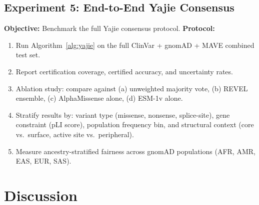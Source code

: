\documentclass[11pt,a4paper]{article}
\theoremstyle{definition}
\begin{document}
\subsection{Experiment 5: End-to-End Yajie Consensus}
\textbf{Objective:} Benchmark the full Yajie consensus protocol.
\textbf{Protocol:}
\begin{enumerate}[leftmargin=*]
    \item Run Algorithm~\ref{alg:yajie} on the full ClinVar + gnomAD + MAVE combined test set.
    \item Report certification coverage, certified accuracy, and uncertainty rates.
    \item Ablation study: compare against (a) unweighted majority vote, (b) REVEL ensemble, (c) AlphaMissense alone, (d) ESM-1v alone.
    \item Stratify results by: variant type (missense, nonsense, splice-site), gene constraint (pLI score), population frequency bin, and structural context (core vs.\ surface, active site vs.\ peripheral).
    \item Measure ancestry-stratified fairness across gnomAD populations (AFR, AMR, EAS, EUR, SAS).
\end{enumerate}
\section{Discussion}
\label{sec:discussion}
\end{document}
